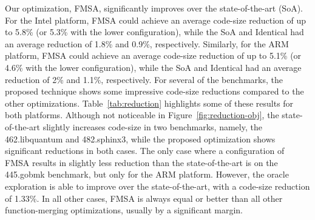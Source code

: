Our optimization, FMSA, significantly improves over the state-of-the-art (SoA).
For the Intel platform, FMSA could achieve an average code-size reduction of up
to 5.8\% (or 5.3\% with the lower configuration), while the SoA and Identical
had an average reduction of 1.8\% and 0.9\%, respectively.
Similarly, for the ARM platform, FMSA could achieve an average code-size
reduction of up to 5.1\% (or 4.6\% with the lower configuration), while the SoA
and Identical had an average reduction of 2\% and 1.1\%, respectively.
For several of the benchmarks, the proposed technique shows some impressive
code-size reductions compared to the other optimizations.
Table~\ref{tab:reduction} highlights some of these results for both platforms.
Although not noticeable in Figure~\ref{fig:reduction-obj}, the state-of-the-art
slightly increases code-size in two benchmarks, namely, the 462.libquantum and
482.sphinx3, while the proposed optimization shows significant reductions in
both cases.
The only case where a configuration of FMSA results in slightly less reduction
than the state-of-the-art is on the 445.gobmk benchmark, but only for the ARM
platform.
However, the oracle exploration is able to improve over the state-of-the-art,
with a code-size reduction of 1.33\%.
In all other cases, FMSA is always equal or better than all other
function-merging optimizations, usually by a significant margin.


